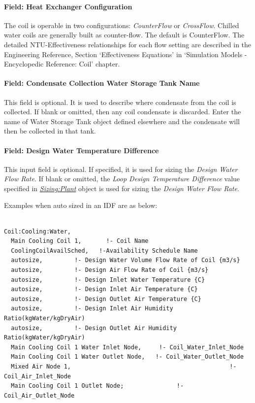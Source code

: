 \paragraph{Field: Heat Exchanger Configuration}\label{field-heat-exchanger-configuration-000}

The coil is operable in two configurations: \textit{CounterFlow} or \textit{CrossFlow}. Chilled water coils are generally built as counter-flow. The default is CounterFlow. The detailed NTU-Effectiveness relationships for each flow setting are described in the Engineering Reference, Section `Effectiveness Equations' in `Simulation Models - Encyclopedic Reference: Coil' chapter.

\paragraph{Field: Condensate Collection Water Storage Tank Name}\label{field-condensate-collection-water-storage-tank-name}

This field is optional. It is used to describe where condensate from the coil is collected. If blank or omitted, then any coil condensate is discarded. Enter the name of Water Storage Tank object defined elsewhere and the condensate will then be collected in that tank.

\paragraph{Field: Design Water Temperature Difference}

This input field is optional. If specified, it is used for sizing the \textit{Design Water Flow Rate}. If blank or omitted, the \textit{Loop Design Temperature Difference} value specified in \textit{\hyperref[sizingplant]{Sizing:Plant}} object is used for sizing the \textit{Design Water Flow Rate}.

Examples when auto sized in an IDF are as below:

\begin{lstlisting}

Coil:Cooling:Water,
  Main Cooling Coil 1,       !- Coil Name
  CoolingCoilAvailSched,   !-Availability Schedule Name
  autosize,         !- Design Water Volume Flow Rate of Coil {m3/s}
  autosize,         !- Design Air Flow Rate of Coil {m3/s}
  autosize,         !- Design Inlet Water Temperature {C}
  autosize,         !- Design Inlet Air Temperature {C}
  autosize,         !- Design Outlet Air Temperature {C}
  autosize,         !- Design Inlet Air Humidity Ratio(kgWater/kgDryAir)
  autosize,         !- Design Outlet Air Humidity Ratio(kgWater/kgDryAir)
  Main Cooling Coil 1 Water Inlet Node,     !- Coil_Water_Inlet_Node
  Main Cooling Coil 1 Water Outlet Node,   !- Coil_Water_Outlet_Node
  Mixed Air Node 1,                                             !- Coil_Air_Inlet_Node
  Main Cooling Coil 1 Outlet Node;               !- Coil_Air_Outlet_Node
\end{lstlisting}


